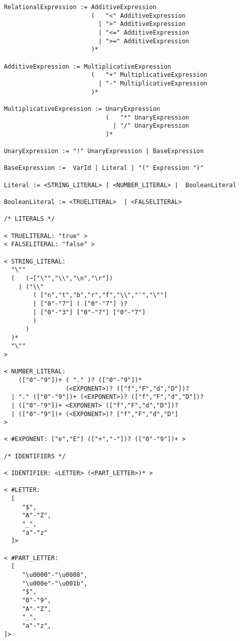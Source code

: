 \begin{verbatim}
	RelationalExpression :=	AdditiveExpression 
	                        (   "<" AdditiveExpression 
	                          | ">" AdditiveExpression 
	                          | "<=" AdditiveExpression 
	                          | ">=" AdditiveExpression 
	                        )*

	AdditiveExpression := MultiplicativeExpression 
	                        (   "+" MultiplicativeExpression 
	                          | "-" MultiplicativeExpression
	                        )*

	MultiplicativeExpression := UnaryExpression 
	                            (   "*" UnaryExpression 
	                              | "/" UnaryExpression 
	                            )*

	UnaryExpression := "!" UnaryExpression | BaseExpression

	BaseExpression :=  VarId | Literal | "(" Expression ")"

	Literal := <STRING_LITERAL> | <NUMBER_LITERAL> |  BooleanLiteral

	BooleanLiteral := <TRUELITERAL>  | <FALSELITERAL>

	/* LITERALS */

	< TRUELITERAL: "true" >
	< FALSELITERAL: "false" >

	< STRING_LITERAL:
      "\""
      (   (~["\"","\\","\n","\r"])
        | ("\\"
            ( ["n","t","b","r","f","\\","'","\""]
            | ["0"-"7"] ( ["0"-"7"] )?
            | ["0"-"3"] ["0"-"7"] ["0"-"7"]
            )
          )
      )*
      "\""
	>

	< NUMBER_LITERAL:
        (["0"-"9"])+ ( "." )? (["0"-"9"])* 
                     (<EXPONENT>)? (["f","F","d","D"])?
      | "." (["0"-"9"])+ (<EXPONENT>)? (["f","F","d","D"])?
      | (["0"-"9"])+ <EXPONENT> (["f","F","d","D"])?
      | (["0"-"9"])+ (<EXPONENT>)? ["f","F","d","D"]
	>

	< #EXPONENT: ["e","E"] (["+","-"])? (["0"-"9"])+ >

	/* IDENTIFIERS */

	< IDENTIFIER: <LETTER> (<PART_LETTER>)* >

	< #LETTER:
      [  
         "$",
         "A"-"Z",
         "_",
         "a"-"z"
	  ]>

	< #PART_LETTER:
      [  
         "\u0000"-"\u0008",
         "\u000e"-"\u001b",
         "$",
         "0"-"9",
         "A"-"Z",
         "_",
         "a"-"z",
	]>

\end{verbatim}
